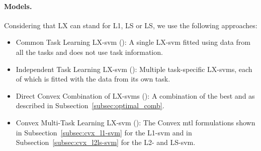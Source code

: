 \paragraph*{Models.}
Considering that {LX} can stand for {L1}, {LS} or {LS}, we use the following approaches:
\begin{itemize}
    \item {Common Task Learning LX-\acrshort{svm} ()}: A single LX-\acrshort{svm} fitted using data from all the tasks and does not use task information.
    \item {Independent Task Learning LX-\acrshort{svm} ()}: Multiple task-specific LX-\acrshort{svm}s, each of which is fitted with the data from its own task.
    \item {Direct Convex Combination of LX-\acrshort{svm}s ()}: A combination of the best  and  as described in Subsection~\ref{subsec:optimal_comb}.
    \item {Convex Multi-Task Learning LX-\acrshort{svm} ()}: The Convex \acrshort{mtl} formulations shown in Subsection~\ref{subsec:cvx_l1-svm} for the L1-\acrshort{svm} and in Subsection~\ref{subsec:cvx_l2ls-svm} for the L2- and LS-\acrshort{svm}.
\end{itemize}

